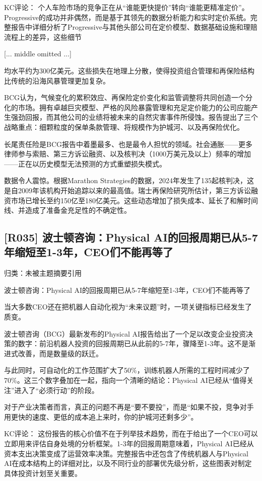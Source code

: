 \documentclass[11pt]{ctexart}
\begin{document}
KC评论： 个人车险市场的竞争正在从“谁能更快提价”转向“谁能更精准定价”。Progressive的成功并非偶然，而是基于其领先的数据分析能力和实时定价系统。完整报告中详细分析了Progressive与其他头部公司在定价模型、数据基础设施和理赔流程上的差异，这些细节

[... middle omitted ...]

均水平约为300亿美元。这些损失在地理上分散，使得投资组合管理和再保险结构比传统的沿海风暴管理更加复杂。

BCG认为，气候变化的累积效应、再保险定价变化和监管调整将共同创造一个分化的市场。拥有卓越巨灾模型、严格的风险暴露管理和充足定价能力的公司应能产生强劲回报，而其他公司的业绩将被未来的自然灾害事件所侵蚀。报告提出了三个战略重点：细颗粒度的保单条款管理、将规模作为护城河、以及再保险优化。

长尾责任险是BCG报告中着墨最多、也是最令人担忧的领域。社会通胀——更多律师参与索赔、第三方诉讼融资、以及核判决（1000万美元及以上）频率的增加——正在以历史模型无法预测的方式重塑损失模式。

数据令人震惊。根据Marathon Strategies的数据，2024年发生了135起核判决，这是自2009年该机构开始追踪以来的最高值。瑞士再保险研究所估计，第三方诉讼融资市场已增长至约150亿至180亿美元。这些动态增加了损失成本、延长了和解时间线、并造成了准备金充足性的不确定性。

\subsection{[R035] 波士顿咨询：Physical AI的回报周期已从5-7年缩短至1-3年，CEO们不能再等了}
{\small\color{refgray}归类：未被主题摘要引用}

波士顿咨询：Physical AI的回报周期已从5-7年缩短至1-3年，CEO们不能再等了

当大多数CEO还在把机器人自动化视为“未来议题”时，一项关键指标已经发生了质变。

波士顿咨询（BCG）最新发布的Physical AI报告给出了一个足以改变企业投资决策的数字：前沿机器人投资的回报周期已从此前的5-7年，骤降至1-3年。这不是渐进式改善，而是数量级的跃迁。

与此同时，可自动化的工作范围扩大了50\%，训练机器人所需的工程时间减少了70\%。这三个数字叠加在一起，指向一个清晰的结论：Physical AI已经从“值得关注”进入了“必须行动”的阶段。

对于产业决策者而言，真正的问题不再是“要不要投”，而是“如果不投，竞争对手用更快的速度、更低的成本追上来时，你的护城河还剩多少”。

KC评论： 这份报告的核心价值不在于列举技术趋势，而在于给出了一个CEO可以立即用来评估自身处境的分析框架。1-3年的回报周期意味着，Physical AI已经从资本支出决策变成了运营效率决策。完整报告中还包含了传统机器人与Physical AI在成本结构上的详细对比，以及不同行业的部署优先级分析，这些图表对制定具体投资计划至关重要。
\end{document}

